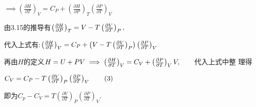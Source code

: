 \documentclass{article}
\begin{document}
$\implies \left( \frac{\partial H}{\partial T}\right) _{V}=C_{P}+\left( 
\frac{\partial H}{\partial P}\right) _{T}\left( \frac{\partial P}{\partial T}%
\right) _{V}$

由3.15的推导有$\left( \frac{\partial H}{%
\partial P}\right) _{T}=V-T\left( \frac{\partial V}{\partial T}\right) _{P},$

\bigskip 代入上式有:$\left( \frac{\partial H}{%
\partial T}\right) _{V}=C_{P}+\left( V-T\left( \frac{\partial V}{\partial T}%
\right) _{P}\right) \left( \frac{\partial P}{\partial T}\right) _{V}\qquad $

再由$H$的定义$H=U+PV\implies \left( \frac{%
\partial H}{\partial T}\right) _{V}=C_{V}+\left( \frac{\partial P}{\partial T%
}\right) _{V}V,\qquad $代入上式中整%
理得

$C_{V}=C_{P}-T\left( \frac{\partial V}{\partial T}\right) _{P}\left( \frac{%
\partial P}{\partial T}\right) _{V}\qquad \left( 3\right) $

即为$C_{p}-C_{V}=T\left( \frac{\partial V}{\partial T}\right)
_{P}\left( \frac{\partial P}{\partial T}\right) _{V}.$
\end{document}
